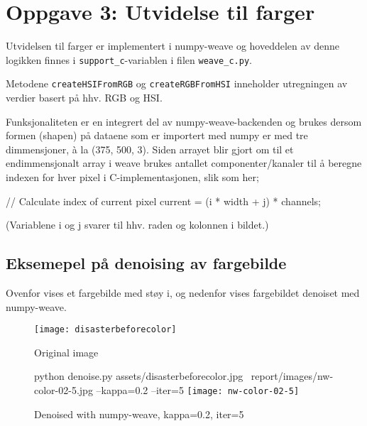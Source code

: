 \section*{Oppgave 3: Utvidelse til farger}

Utvidelsen til farger er implementert i numpy-weave og hoveddelen av denne logikken finnes i \verb;support_c;-variablen i filen \verb;weave_c.py;.

Metodene \verb;createHSIFromRGB; og \verb;createRGBFromHSI; inneholder utregningen av verdier basert på hhv. RGB og HSI.

Funksjonaliteten er en integrert del av numpy-weave-backenden og brukes dersom formen (shapen) på dataene som er importert med numpy er med tre dimmensjoner, à la (375, 500, 3). Siden arrayet blir gjort om til et endimmensjonalt array i weave brukes antallet componenter/kanaler til å beregne indexen for hver pixel i C-implementasjonen, slik som her;

// Calculate index of current pixel
current = (i * width + j) * channels;

(Variablene i og j svarer til hhv. raden og kolonnen i bildet.)

\pagebreak

\subsection*{Eksemepel på denoising av fargebilde}

Ovenfor vises et fargebilde med støy i, og nedenfor vises fargebildet denoiset med numpy-weave.

\begin{figure}[!h]
\centering
\texttt{[image: disasterbeforecolor]}
\caption{Original image}
\end{figure}

\pagebreak

\begin{figure}[!h]
\centering
python denoise.py assets/disasterbeforecolor.jpg \
report/images/nw-color-02-5.jpg --kappa=0.2 --iter=5
\texttt{[image: nw-color-02-5]}
\caption{Denoised with numpy-weave, kappa=0.2, iter=5}
\end{figure}

\pagebreak